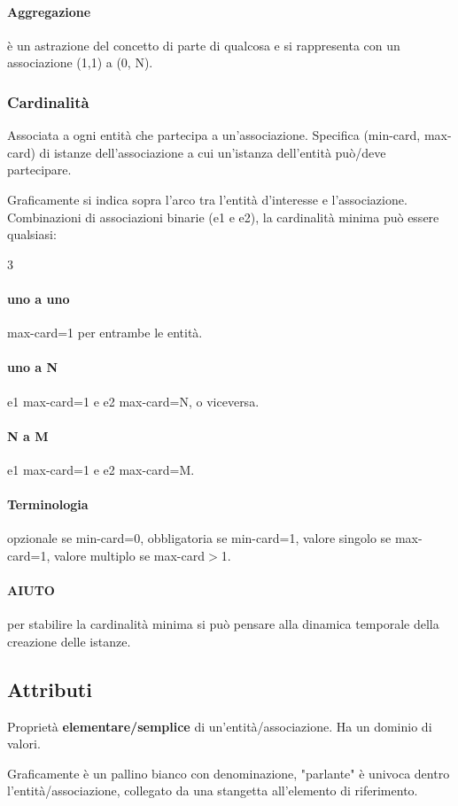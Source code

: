 \paragraph{Aggregazione} è un astrazione del concetto di parte di qualcosa e si rappresenta con un associazione (1,1) a (0, N).
\subsubsection{Cardinalità}
Associata a ogni entità che partecipa a un'associazione. Specifica (min-card, max-card) di istanze dell'associazione a cui un'istanza dell'entità può/deve partecipare.

Graficamente si indica sopra l'arco tra l'entità d'interesse e l'associazione.
Combinazioni di associazioni binarie (e1 e e2), la cardinalità minima può essere qualsiasi:
\begin{paracol}{3}
	\paragraph{uno a uno} max-card=1 per entrambe le entità.
	\switchcolumn
	\paragraph{uno a N} e1 max-card=1 e e2 max-card=N, o viceversa.
	\switchcolumn
	\paragraph{N a M} e1 max-card=1 e e2 max-card=M.
\end{paracol}
\paragraph{Terminologia} opzionale se min-card=0, obbligatoria se min-card=1, valore singolo se max-card=1, valore multiplo se max-card$>$1.
\paragraph{AIUTO} per stabilire la cardinalità minima si può pensare alla dinamica temporale della creazione delle istanze.

\subsection{Attributi}
Proprietà \textbf{elementare/semplice} di un'entità/associazione. Ha un dominio di valori.

Graficamente è un pallino bianco con denominazione, "parlante" è univoca dentro l'entità/associazione, collegato da una stangetta all'elemento di riferimento.

